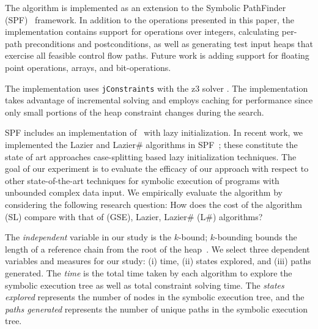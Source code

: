 
The \symtxt{} algorithm is implemented as an extension to the Symbolic
PathFinder (SPF)~\cite{DBLP:journals/ase/PasareanuVBGMR13}
framework. In addition to the operations presented in this paper, the
implementation contains support for operations over integers,
calculating per-path preconditions and postconditions, as well as
generating test input heaps that exercise all feasible control flow
paths. Future work is adding support for floating point
operations, arrays, and bit-operations.

The \symtxt{} implementation uses \texttt{jConstraints} with the z3 solver \cite{ase2014-ghilrr,jpf2014-dghirr,deMouraBjorner08Z3}. The implementation takes advantage of incremental solving and employs caching for performance since only small portions of the heap constraint changes during the search.

SPF includes an implementation of~\gsetxt{} with lazy initialization.
In recent work, we implemented the Lazier and Lazier\# algorithms in
SPF~\cite{Hillery:2014}; these constitute the state of art approaches
case-splitting based lazy initialization techniques. The goal of our
experiment is to evaluate the efficacy of our approach with respect to
other state-of-the-art techniques for symbolic execution of programs
with unbounded complex data input. We empirically evaluate the
\symtxt{} algorithm by considering the following research question:
How does the cost of the \symtxt{} algorithm (SL) compare with that of
\gsetxt{} (GSE), Lazier, Lazier\# (L\#) algorithms?

The \emph{independent} variable in our study is the $k$-bound;
$k$-bounding bounds the length of a reference chain from the root of
the heap~\cite{Kiasan06}.  We select three dependent variables and
measures for our study: (i) time, (ii) states explored, and (iii)
paths generated. The \emph{time} is the total time taken by each
algorithm to explore the symbolic execution tree as well as total
constraint solving time. The \emph{states explored} represents the
number of nodes in the symbolic execution tree, and the \emph{paths
  generated} represents the number of unique paths in the symbolic
execution tree.

